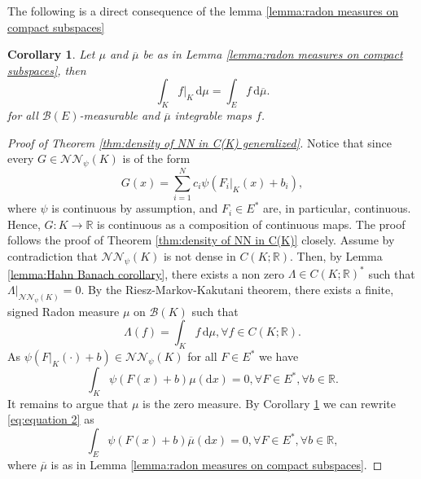 \documentclass[11pt,a4paper,twoside,openany]{report}
\numberwithin{equation}{section}
\newcommand{\diff}{\mathrm{d}}
\theoremstyle{plain} %
\newtheorem{corollary}[theorem]{Corollary}
\theoremstyle{definition} %
\theoremstyle{remark} %
\begin{document}
The following is a direct consequence of the lemma \ref{lemma:radon measures on compact subspaces}
\begin{corollary}\label{cor:discriminatory property extends also true for subspace}
 Let \(\mu\) and \(\overline{\mu}\) be as in Lemma \ref{lemma:radon measures on compact subspaces}, then 
 \begin{equation*}
     \int_K f|_K\,\diff \mu=\int_E f\,\diff \overline{\mu}.
 \end{equation*}
 for all \(\mathcal{B}(E)\)-measurable and \(\overline{\mu}\) integrable maps \(f\).
\end{corollary}
\begin{proof}[Proof of Theorem \ref{thm:density of NN in C(K) generalized}]
Notice that since every \(G\in\mathcal{NN}_{\psi}(K)\) is of the form 
    \begin{equation*}
        G(x) =\sum_{i=1}^Nc_i\psi(F_i|_K(x)+b_i),
    \end{equation*}
    where \(\psi\) is continuous by assumption, and \(F_i\in E^*\) are, in particular, continuous. Hence, \(G:K\to\mathbb{R}\) is continuous as a composition of continuous maps. The proof follows the proof of Theorem \ref{thm:density of NN in C(K)} closely. Assume by contradiction that \(\mathcal{NN}_{\psi}(K)\) is not dense in \(C(K;\mathbb{R})\). Then, by Lemma \ref{lemma:Hahn Banach corollary}, there exists a non zero \(\Lambda\in C(K;\mathbb{R})^*\) such that \(\Lambda|_{\mathcal{NN}_{\psi}(K)}=0\). By the Riesz-Markov-Kakutani theorem, there exists a finite, signed Radon measure \(\mu\) on \(\mathcal{B}(K)\) such that 
    \begin{equation*}
    \Lambda(f)=\int_Kf\,\diff \mu,\forall f\in C(K;\mathbb{R}).
    \end{equation*}
As \(\psi(F|_K(\cdot)+b)\in\mathcal{NN}_{\psi}(K)\) for all \(F\in E^*\) we have
\begin{equation}\label{eq:equation 2}
    \int_K\psi(F(x)+b)\mu(\diff x)=0,\forall F\in E^*,\forall b\in\mathbb{R}.
\end{equation}
It remains to argue that \(\mu\) is the zero measure. By Corollary \ref{cor:discriminatory property extends also true for subspace} we can rewrite \eqref{eq:equation 2} as 
\begin{equation}\label{eq:equation 3}
    \int_{E}\psi(F(x)+b)\overline{\mu}(\diff x)=0,\forall F\in E^*,\forall b\in\mathbb{R},
\end{equation}
where \(\overline{\mu}\) is as in Lemma \ref{lemma:radon measures on compact subspaces}.

\end{proof}
\end{document}

